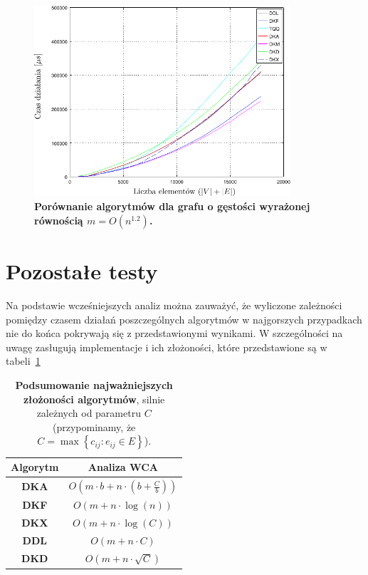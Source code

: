 \begin{figure}[!htbp]
	\null\hfill
	\includegraphics[width=0.85\textwidth]{Chapter_IV/graph120_psfrag.pdf}
	\hfill\null
	\caption{
		\textbf{Porównanie algorytmów dla grafu o gęstości wyrażonej równością $m = O \left( n^{1.2} \right)$.}
	}
	\label{fig:plotFullGraph_1.20}
\end{figure}




\section{Pozostałe testy}




Na podstawie wcześniejszych analiz można zauważyć, że wyliczone zależności pomiędzy czasem działań poszczególnych algorytmów w najgorszych przypadkach nie do końca pokrywają się z przedstawionymi wynikami.
W szczególności na uwagę zasługują implementacje i ich złożoności, które przedstawione są w tabeli~\ref{tab:wcaSummary}

\begin{table}[!htbp]
	\centering
	\begin{tabular}{cc}
		Algorytm & Analiza \textsc{WCA} \\
		\hline
		\textbf{DKA} & $ O \left( m \cdot b + n \cdot \left( b + \frac{C}{b}\right)\right)$ \\
		\textbf{DKF} & $ O \left( m + n \cdot \log \left( n \right) \right)$ \\
		\textbf{DKX} & $O \left( m + n \cdot \log \left( C \right) \right)$ \\
		\textbf{DDL} & $O \left( m + n \cdot C  \right)$ \\
		\textbf{DKD} & $O \left( m + n \cdot \sqrt{C} \right)$ \\
		\hline
	\end{tabular}
	\caption{
		\textbf{Podsumowanie najważniejszych złożoności algorytmów}, silnie zależnych od parametru $C$ (przypominamy, że $ C = \max \left\{ c_{ij} : e_{ij} \in E \right\}$).
	}
	\label{tab:wcaSummary}
\end{table}
\vspace{-12pt}



